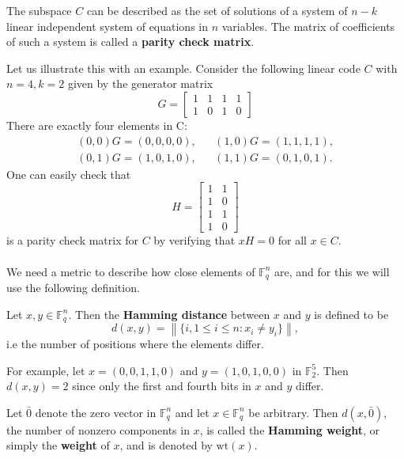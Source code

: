 \documentclass[english,bachelor]{liumaiex}
\begin{document}
\begin{define}
The subspace $C$ can be described as the set of solutions of a system of $n-k$ linear independent system of equations in $n$ variables. The matrix of coefficients of such a system is called a \textbf{parity check matrix}.
\end{define}
Let us illustrate this with an example. Consider the following linear code $C$ with $n=4, k=2$ given by the generator matrix
\begin{displaymath}
G=
\begin{bmatrix}
1 & 1 & 1 & 1 \\
1 & 0 & 1 & 0
\end{bmatrix}
\end{displaymath}
There are exactly four elements in C:
\begin{displaymath}
\begin{matrix}
(0,0)G=(0,0,0,0), & & (1,0)G=(1,1,1,1), \\
(0,1)G=(1,0,1,0), & & (1,1)G=(0,1,0,1).
\end{matrix}
\end{displaymath}
One can easily check that
\begin{displaymath}
H=
\begin{bmatrix}
1 & 1 \\
1 & 0 \\
1 & 1 \\
1 & 0
\end{bmatrix}
\end{displaymath}
is a parity check matrix for $C$ by verifying that $xH=0$ for all $x\in C$.\\ \\
We need a metric to describe how close elements of $\mathbb{F}_q^n$ are, and for this we will use the following definition.

\begin{define}
Let $x,y\in\mathbb{F}_q^n$. Then the \textbf{Hamming distance} between $x$ and $y$ is defined to be
\begin{displaymath}
d(x,y)=\left\|\{i,1\leq i\leq n\colon x_i\neq y_i\}\right\|,
\end{displaymath}
i.e the number of positions where the elements differ.
\end{define}
For example, let $x=(0,0,1,1,0)$ and $y=(1,0,1,0,0)$ in $\mathbb{F}_2^5$. Then $d(x,y)=2$ since only the first and fourth bits in $x$ and $y$ differ.

\begin{define}
Let $\bar{0}$ denote the zero vector in $\mathbb{F}_q^n$ and let $x\in\mathbb{F}_q^n$ be arbitrary. Then $d(x,\bar{0})$, the number of nonzero components in $x$, is called the \textbf{Hamming weight}, or simply the \textbf{weight} of $x$, and is denoted by $\textrm{wt}(x)$.
\end{define}
\end{document}
